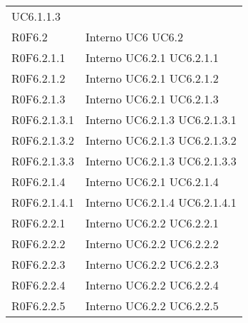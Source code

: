 \begin{longtable}{p{2.5cm}!{\VRule[1pt]}p{2.5cm}}
 \newline UC6.1.1.3
 \\
R0F6.2 & Interno \newline UC6
 \newline UC6.2
 \\
R0F6.2.1.1 & Interno \newline UC6.2.1
 \newline UC6.2.1.1
 \\
R0F6.2.1.2 & Interno \newline UC6.2.1
 \newline UC6.2.1.2
 \\
R0F6.2.1.3 & Interno \newline UC6.2.1
 \newline UC6.2.1.3
 \\
R0F6.2.1.3.1 & Interno \newline UC6.2.1.3
 \newline UC6.2.1.3.1
 \\
R0F6.2.1.3.2 & Interno \newline UC6.2.1.3
 \newline UC6.2.1.3.2
 \\
R0F6.2.1.3.3 & Interno \newline UC6.2.1.3
 \newline UC6.2.1.3.3
 \\
R0F6.2.1.4 & Interno \newline UC6.2.1
 \newline UC6.2.1.4
 \\
R0F6.2.1.4.1 & Interno \newline UC6.2.1.4
 \newline UC6.2.1.4.1
 \\
R0F6.2.2.1 & Interno \newline UC6.2.2
 \newline UC6.2.2.1
 \\
R0F6.2.2.2 & Interno \newline UC6.2.2
 \newline UC6.2.2.2
 \\
R0F6.2.2.3 & Interno \newline UC6.2.2
 \newline UC6.2.2.3
 \\
R0F6.2.2.4 & Interno \newline UC6.2.2
 \newline UC6.2.2.4
 \\
R0F6.2.2.5 & Interno \newline UC6.2.2
 \newline UC6.2.2.5

\end{longtable}
